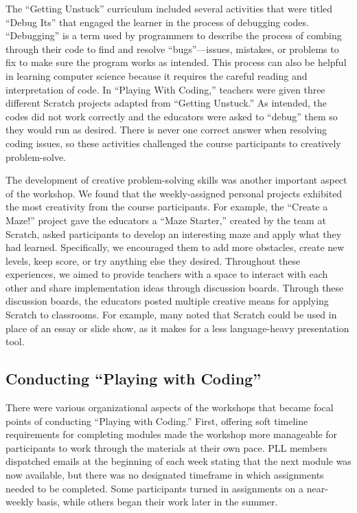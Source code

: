 \documentclass[11.5pt]{sig-alternate} %
\begin{document}
\begin{large}
The “Getting Unstuck” curriculum included several activities that were titled “Debug Its” that engaged the learner in the process of debugging codes. “Debugging” is a term used by programmers to describe the process of combing through their code to find and resolve “bugs”—issues, mistakes, or problems to fix to make sure the program works as intended. This process can also be helpful in learning computer science because it requires the careful reading and interpretation of code. In “Playing With Coding,” teachers were given three different Scratch projects adapted from “Getting Unstuck.” As intended, the codes did not work correctly and the educators were asked to “debug” them so they would run as desired. There is never one correct answer when resolving coding issues, so these activities challenged the course participants to creatively problem-solve.

The development of creative problem-solving skills was another important aspect of the workshop. We found that the weekly-assigned personal projects exhibited the most creativity from the course participants. For example, the “Create a Maze!” project gave the educators a “Maze Starter,” created by the team at Scratch, asked participants to develop an interesting maze and apply what they had learned. Specifically, we encouraged them to add more obstacles, create new levels, keep score, or try anything else they desired. Throughout these experiences, we aimed to provide teachers with a space to interact with each other and share implementation ideas through discussion boards. Through these discussion boards, the educators posted multiple creative means for applying Scratch to classrooms. For example, many noted that Scratch could be used in place of an essay or slide show, as it makes for a less language-heavy presentation tool.

\subsection*{Conducting “Playing with Coding”}

There were various organizational aspects of the workshops that became focal points of conducting “Playing with Coding.” First, offering soft timeline requirements for completing modules made the workshop more manageable for participants to work through the materials at their own pace. PLL members dispatched emails at the beginning of each week stating that the next module was now available, but there was no designated timeframe in which assignments needed to be completed. Some participants turned in assignments on a near-weekly basis, while others began their work later in the summer.


\end{large}
\end{document}
